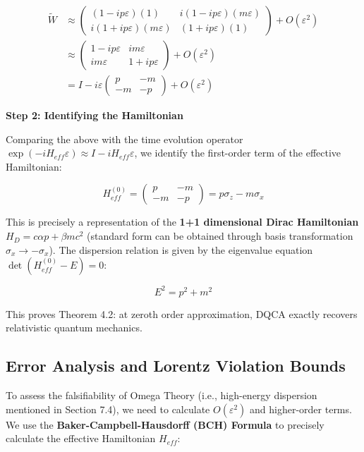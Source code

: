 \begin{align*}
\tilde{W} &\approx \begin{pmatrix} (1 - ip\varepsilon)(1) & i(1 - ip\varepsilon)(m\varepsilon) \\ i(1 + ip\varepsilon)(m\varepsilon) & (1 + ip\varepsilon)(1) \end{pmatrix} + O(\varepsilon^2) \\
&\approx \begin{pmatrix} 1 - ip\varepsilon & im\varepsilon \\ im\varepsilon & 1 + ip\varepsilon \end{pmatrix} + O(\varepsilon^2) \\
&= I - i\varepsilon \begin{pmatrix} p & -m \\ -m & -p \end{pmatrix} + O(\varepsilon^2)
\end{align*}

\textbf{Step 2: Identifying the Hamiltonian}

Comparing the above with the time evolution operator $\exp(-i H_{eff} \varepsilon) \approx I - i H_{eff} \varepsilon$, we identify the first-order term of the effective Hamiltonian:

\[H_{eff}^{(0)} = \begin{pmatrix} p & -m \\ -m & -p \end{pmatrix} = p \sigma_z - m \sigma_x\]

This is precisely a representation of the \textbf{1+1 dimensional Dirac Hamiltonian} $H_D = c \alpha p + \beta m c^2$ (standard form can be obtained through basis transformation $\sigma_x \to -\sigma_x$).
The dispersion relation is given by the eigenvalue equation $\det(H_{eff}^{(0)} - E) = 0$:

\[E^2 = p^2 + m^2\]

This proves Theorem 4.2: at zeroth order approximation, DQCA exactly recovers relativistic quantum mechanics.

\subsection{Error Analysis and Lorentz Violation Bounds}

To assess the falsifiability of Omega Theory (i.e., high-energy dispersion mentioned in Section 7.4), we need to calculate $O(\varepsilon^2)$ and higher-order terms.
We use the \textbf{Baker-Campbell-Hausdorff (BCH) Formula} to precisely calculate the effective Hamiltonian $H_{eff}$:

